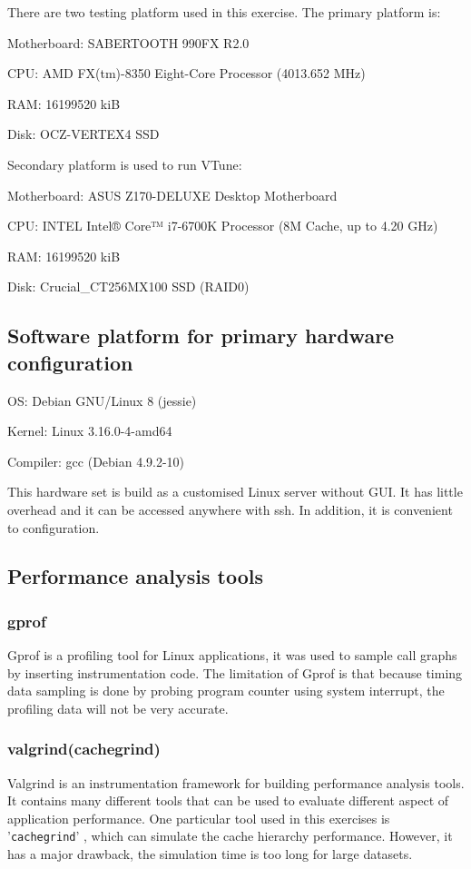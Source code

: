 \documentclass[conference]{IEEEtran}
\begin{document}
There are two testing platform used in this exercise. The primary platform is:

Motherboard:	SABERTOOTH 990FX R2.0

CPU:	AMD FX(tm)-8350 Eight-Core Processor (4013.652 MHz)

RAM:	16199520 kiB

Disk:	OCZ-VERTEX4 SSD


Secondary platform is used to run VTune:

Motherboard:	ASUS Z170-DELUXE Desktop Motherboard

CPU:	INTEL Intel® Core™ i7-6700K Processor (8M Cache, up to 4.20 GHz)

RAM:	16199520 kiB

Disk:	Crucial\_CT256MX100 SSD (RAID0)
\subsection{Software platform for primary hardware configuration}

OS:	Debian GNU/Linux 8 (jessie)

Kernel:	Linux 3.16.0-4-amd64

Compiler:	gcc (Debian 4.9.2-10)

This hardware set is build as a customised Linux server without GUI. It has little overhead and it can be accessed anywhere with ssh. In addition, it is convenient to configuration. 

\subsection{Performance analysis tools}

\subsubsection{gprof}

Gprof is a profiling tool for Linux applications, it was used to sample call graphs by inserting instrumentation code. The limitation of Gprof is that because timing data sampling is done by probing program counter using system interrupt, the profiling data will not be very accurate.
\cite{graham1982gprof}

\subsubsection{valgrind(cachegrind)}

Valgrind \cite{nethercote2003valgrind} is an instrumentation framework for building performance analysis tools. It contains many different tools that can be used to evaluate different aspect of application performance. One particular tool used in this exercises is '\texttt{cachegrind}' \cite{seward2004cachegrind}, which can simulate the cache hierarchy performance. However, it has a major drawback, the simulation time is too long for large datasets.
\end{document}

